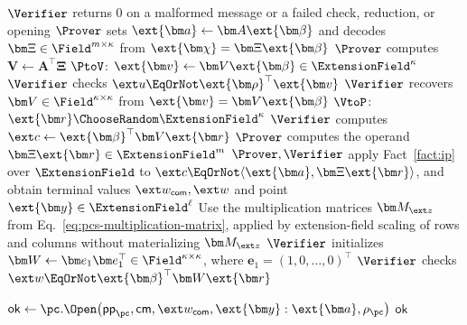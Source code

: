 \begin{algorithm}[!t]
\caption{Packed opening protocol}
\label{alg:packed-pcs}

\(\Verifier\) returns \(0\) on a malformed message or a failed
check, reduction, or opening\;
\(\Prover\) sets
\(\ext{\bm a}\leftarrow\bm A\ext{\bm\beta}\) and decodes
\(\bm\Xi\in\Field^{m\times\kappa}\) from
\(\ext{\bm\chi}=\bm\Xi\ext{\bm\beta}\)\;
\(\Prover\) computes \(\bm V\leftarrow\bm A^\top\bm\Xi\)\;
\(\PtoV\): \(\ext{\bm v}\leftarrow\bm V\ext{\bm\beta}
\in\ExtensionField^\kappa\)\;
\(\Verifier\) checks
\(\ext u\EqOrNot\ext{\bm\rho}^{\top}\ext{\bm v}\)\;
\(\Verifier\) recovers \(\bm V\in\Field^{\kappa\times\kappa}\)
from \(\ext{\bm v}=\bm V\ext{\bm\beta}\)\;
\(\VtoP\): \(\ext{\bm r}\ChooseRandom\ExtensionField^\kappa\)\;
\(\Verifier\) computes
\(\ext c\leftarrow\ext{\bm\beta}^{\top}\bm V\ext{\bm r}\)\;
\(\Prover\) computes the operand
\(\bm\Xi\ext{\bm r}\in\ExtensionField^m\)\;
\(\Prover,\Verifier\) apply Fact~\ref{fact:ip} over
\(\ExtensionField\) to
\(\ext c\EqOrNot\langle\ext{\bm a},\bm\Xi\ext{\bm r}\rangle\),
and obtain terminal values \(\ext w_{\mathsf{com}},\ext w\)
and point \(\ext{\bm y}\in\ExtensionField^\ell\)\;
Use the multiplication matrices \(\bm M_{\ext z}\) from
Eq.~\eqref{eq:pcs-multiplication-matrix}, applied by extension-field
scaling of rows and columns without materializing \(\bm M_{\ext z}\)\;
\(\Verifier\) initializes
\(\bm W\leftarrow\bm e_1\bm e_1^\top\in\Field^{\kappa\times\kappa}\),
where \(\bm e_1=(1,0,\ldots,0)^\top\)\;
\(\Verifier\) checks
\(\ext w\EqOrNot\ext{\bm\beta}^{\top}\bm W\ext{\bm r}\)\;

\(\mathsf{ok}\leftarrow
\pc.\Open\!\left(
    \mathsf{pp}_{\pc},\mathsf{cm},\ext w_{\mathsf{com}},
    \ext{\bm y}:\ext{\bm a},\rho_{\pc}
\right)\)\;
\Return \(\mathsf{ok}\)\;
\end{algorithm}
